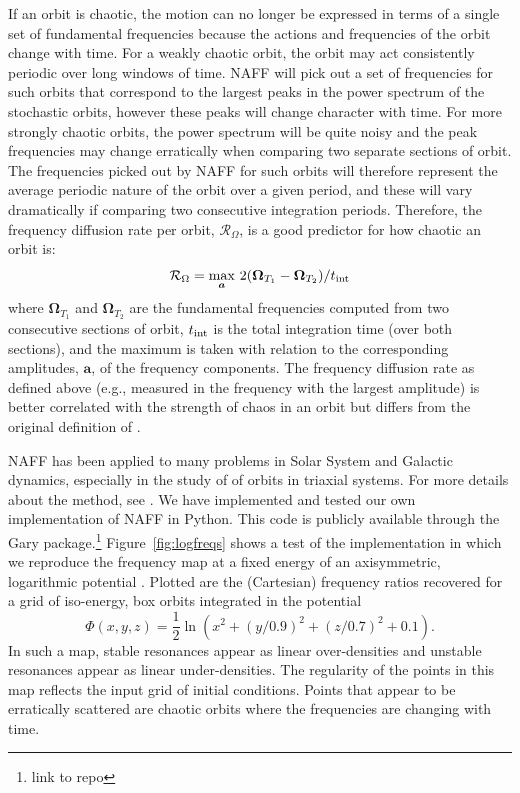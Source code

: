 \documentclass[letterpaper,12pt,preprint]{aastex}
\newcommand{\bs}[1]{\boldsymbol{#1}}
\newcommand{\inttime}{t_{\rm int}}
\newcommand{\fdrate}{\mathcal{R}_\Omega}
\begin{document}
If an orbit is chaotic, the motion can no longer be expressed in terms of a single set of fundamental frequencies because the actions and frequencies of the orbit change with time. For a weakly chaotic orbit, the orbit may act consistently periodic over long windows of time. NAFF will pick out a set of frequencies for such orbits that correspond to the largest peaks in the power spectrum of the stochastic orbits, however these peaks will change character with time. For more strongly chaotic orbits, the power spectrum will be quite noisy and the peak frequencies may change erratically when comparing two separate sections of orbit. The frequencies picked out by NAFF for such orbits will therefore represent the average periodic nature of the orbit over a given period, and these will vary dramatically if comparing two consecutive integration periods. Therefore, the frequency diffusion rate per orbit, $\fdrate$, is a good predictor for how chaotic an orbit is:
\begin{equation}
	\fdrate = \max_{\bs{a}}\,2(\bs{\Omega}_{T_1} - \bs{\Omega}_{T_2}) / \inttime \label{eq:fdrate}
\end{equation}
where $\bs{\Omega}_{T_1}$ and $\bs{\Omega}_{T_2}$ are the fundamental frequencies computed from two consecutive sections of orbit, $\inttime$ is the total integration time (over both sections), and the maximum is taken with relation to the corresponding amplitudes, $\bs{a}$, of the frequency components. The frequency diffusion rate as defined above (e.g., measured in the frequency with the largest amplitude) is better correlated with the strength of chaos in an orbit \citep{valluri??} but differs from the original definition of \cite{valluri98}.

NAFF has been applied to many problems in Solar System and Galactic dynamics, especially in the study of of orbits in triaxial systems. For more details about the method, see \cite{papaphilippou96, laskar, etc.}. We have implemented and tested our own implementation of NAFF in Python. This code is publicly available through the Gary package.\footnote{link to repo} Figure~\ref{fig:logfreqs} shows a test of the implementation in which we reproduce the frequency map at a fixed energy of an axisymmetric, logarithmic potential \cite[][pg. 260, Figure~3.45]{binneytremaine}. Plotted are the (Cartesian) frequency ratios recovered for a grid of iso-energy, box orbits integrated in the potential
\begin{equation}
	\Phi(x,y,z) = \frac{1}{2}\ln\left(x^2 + (y/0.9)^2 + (z/0.7)^2 + 0.1\right). \label{eq:logpotential}
\end{equation}
In such a map, stable resonances appear as linear over-densities and unstable resonances appear as linear under-densities. The regularity of the points in this map reflects the input grid of initial conditions. Points that appear to be erratically scattered are chaotic orbits where the frequencies are changing with time.
\end{document}

